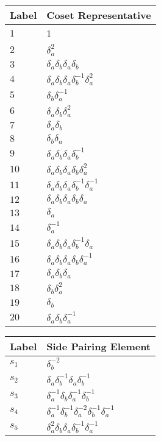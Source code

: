 \documentclass{article}
\begin{document}
\begin{center}
\begin{tabular}{ll}
\toprule
Label & Coset Representative\\
\midrule
$1$ & 1 \\
$2$ & $\delta_a^{2}$ \\
$3$ & $\delta_a^{}\delta_b^{}\delta_a^{}\delta_b^{}$ \\
$4$ & $\delta_a^{}\delta_b^{}\delta_a^{}\delta_b^{-1}\delta_a^{2}$ \\
$5$ & $\delta_b^{}\delta_a^{-1}$ \\
$6$ & $\delta_a^{}\delta_b^{}\delta_a^{2}$ \\
$7$ & $\delta_a^{}\delta_b^{}$ \\
$8$ & $\delta_b^{}\delta_a^{}$ \\
$9$ & $\delta_a^{}\delta_b^{}\delta_a^{}\delta_b^{-1}$ \\
$10$ & $\delta_a^{}\delta_b^{}\delta_a^{}\delta_b^{}\delta_a^{2}$ \\
$11$ & $\delta_a^{}\delta_b^{}\delta_a^{}\delta_b^{-1}\delta_a^{-1}$ \\
$12$ & $\delta_a^{}\delta_b^{}\delta_a^{}\delta_b^{}\delta_a^{}$ \\
$13$ & $\delta_a^{}$ \\
$14$ & $\delta_a^{-1}$ \\
$15$ & $\delta_a^{}\delta_b^{}\delta_a^{}\delta_b^{-1}\delta_a^{}$ \\
$16$ & $\delta_a^{}\delta_b^{}\delta_a^{}\delta_b^{}\delta_a^{-1}$ \\
$17$ & $\delta_a^{}\delta_b^{}\delta_a^{}$ \\
$18$ & $\delta_b^{}\delta_a^{2}$ \\
$19$ & $\delta_b^{}$ \\
$20$ & $\delta_a^{}\delta_b^{}\delta_a^{-1}$ \\
\bottomrule
\end{tabular}
\hfill
\begin{tabular}{ll}
\toprule
Label & Side Pairing Element\\
\midrule
$s_{1}$ & $\delta_b^{-2}$ \\
$s_{2}$ & $\delta_a^{}\delta_b^{-1}\delta_a^{}\delta_b^{-1}$ \\
$s_{3}$ & $\delta_a^{-1}\delta_b^{}\delta_a^{-1}\delta_b^{-1}$ \\
$s_{4}$ & $\delta_a^{-1}\delta_b^{-1}\delta_a^{-2}\delta_b^{-1}\delta_a^{-1}$ \\
$s_{5}$ & $\delta_a^{2}\delta_b^{}\delta_a^{}\delta_b^{-1}\delta_a^{-1}$ \\

\end{tabular}
\end{center}
\end{document}
